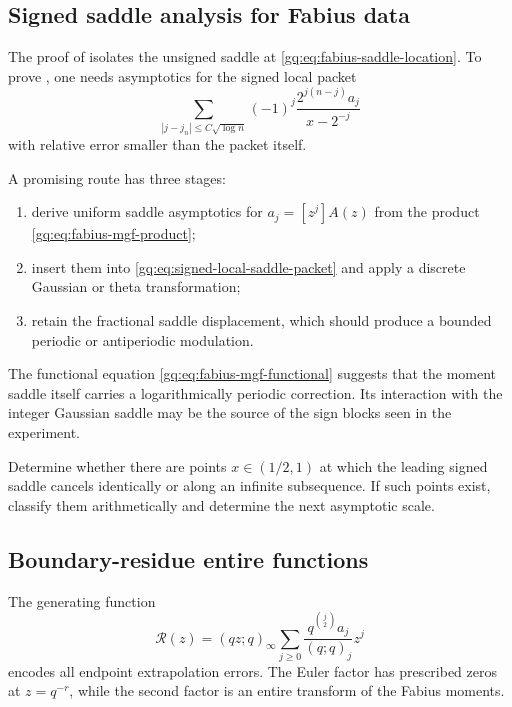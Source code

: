\subsection{Signed saddle analysis for Fabius data}

The proof of  isolates the unsigned saddle at
\eqref{gq:eq:fabius-saddle-location}.  To prove
, one needs asymptotics for the signed local
packet
\begin{equation}
 \sum_{|j-j_n|\le C\sqrt{\log n}}
 (-1)^j\frac{2^{j(n-j)}a_j}{x-2^{-j}}
 \label{gq:eq:signed-local-saddle-packet}
\end{equation}
with relative error smaller than the packet itself.

A promising route has three stages:
\begin{enumerate}
\item derive uniform saddle asymptotics for $a_j=[z^j]A(z)$ from the product
      \eqref{gq:eq:fabius-mgf-product};
\item insert them into \eqref{gq:eq:signed-local-saddle-packet} and apply a
      discrete Gaussian or theta transformation;
\item retain the fractional saddle displacement, which should produce a
      bounded periodic or antiperiodic modulation.
\end{enumerate}
The functional equation \eqref{gq:eq:fabius-mgf-functional} suggests that the
moment saddle itself carries a logarithmically periodic correction.  Its
interaction with the integer Gaussian saddle may be the source of the sign
blocks seen in the experiment.

\begin{problem}
\label{gq:prob:exceptional-gap-points}
Determine whether there are points $x\in(1/2,1)$ at which the leading signed
saddle cancels identically or along an infinite subsequence.  If such points
exist, classify them arithmetically and determine the next asymptotic scale.
\end{problem}

\subsection{Boundary-residue entire functions}

The generating function
\begin{equation}
 \mathcal R(z)=(qz;q)_\infty
 \sum_{j\ge0}\frac{q^{\binom j2}a_j}{(q;q)_j}z^j
 \label{gq:eq:boundary-residue-entire-function}
\end{equation}
encodes all endpoint extrapolation errors.  The Euler factor has prescribed
zeros at $z=q^{-r}$, while the second factor is an entire transform of the
Fabius moments.


